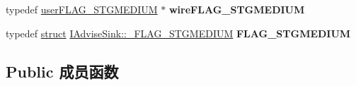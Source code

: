 \begin{DoxyCompactItemize}
typedef \hyperlink{struct_i_advise_sink_1_1__user_f_l_a_g___s_t_g_m_e_d_i_u_m}{user\+F\+L\+A\+G\+\_\+\+S\+T\+G\+M\+E\+D\+I\+UM} $\ast$ {\bfseries wire\+F\+L\+A\+G\+\_\+\+S\+T\+G\+M\+E\+D\+I\+UM}
\item 
\mbox{\label{interface_i_advise_sink_a3b0e5ede259b6e1a52af8d0dd45afd3f}} 
typedef \hyperlink{interfacestruct}{struct} \hyperlink{struct_i_advise_sink_1_1___f_l_a_g___s_t_g_m_e_d_i_u_m}{I\+Advise\+Sink\+::\+\_\+\+F\+L\+A\+G\+\_\+\+S\+T\+G\+M\+E\+D\+I\+UM} {\bfseries F\+L\+A\+G\+\_\+\+S\+T\+G\+M\+E\+D\+I\+UM}
\end{DoxyCompactItemize}
\subsection*{Public 成员函数}
